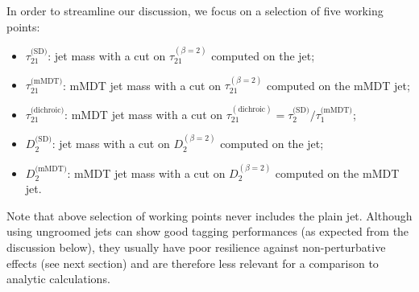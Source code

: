 In order to streamline our discussion, we focus on a selection of five working
points:
\begin{itemize}
  \setlength\itemsep{0cm}
  \item $\tau_{21}^\text{(SD)}$: \SD jet mass with a cut on
    $\tau_{21}^{(\beta=2)}$ computed on the \SD jet;
  \item $\tau_{21}^\text{(mMDT)}$: mMDT jet mass with a cut on
    $\tau_{21}^{(\beta=2)}$ computed on the mMDT jet;
  \item $\tau_{21}^\text{(dichroic)}$: mMDT jet mass with a cut on
    $\tau_{21}^{(\text{dichroic})}=\tau_2^\text{(SD)}/\tau_1^\text{(mMDT)}$;
  \item $D_2^\text{(SD)}$: \SD jet mass with a cut on
    $D_2^{(\beta=2)}$ computed on the \SD jet;
  \item $D_2^\text{(mMDT)}$: mMDT jet mass with a cut on
    $D_2^{(\beta=2)}$ computed on the mMDT jet.
\end{itemize}
Note that above selection of working points never includes the plain jet. Although using ungroomed jets can show good tagging performances (as expected from the discussion below),
they usually have poor resilience against non-perturbative effects (see next section) and are therefore
less relevant for a comparison to analytic calculations.

